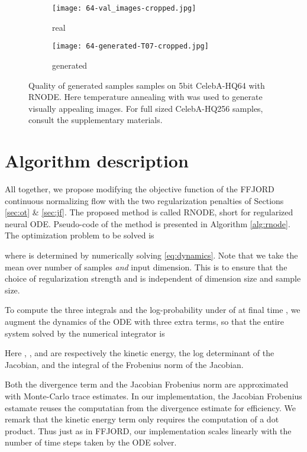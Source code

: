 \documentclass{article}
\theoremstyle{definition}
\theoremstyle{remark}
\begin{document}
\begin{figure*}
  \vskip 0.2in
  \centering
    \begin{subfigure}[t]{.45\textwidth}
    \centering
    \texttt{[image: 64-val\_images-cropped.jpg]}
    \caption{real}\label{fig:realceleb64}
    \end{subfigure} 
    \hspace{3em}
    \begin{subfigure}[t]{.45\textwidth}
    \centering
    \texttt{[image: 64-generated-T07-cropped.jpg]}
    \caption{generated}\label{fig:fakeceleb64}
    \end{subfigure}
    \caption{Quality of generated samples samples on 5bit CelebA-HQ64 with RNODE. Here
      temperature annealing \cite{glow} with  was used to generate
    visually appealing images. For full sized CelebA-HQ256 samples, consult the
  supplementary materials.}\label{fig:celebahq64}
    \vskip -0.2in
\end{figure*}


\section{Algorithm description}
All together, we propose modifying the objective function of the FFJORD continuous normalizing flow
\cite{grathwohl_ffjord} with the two regularization penalties of Sections
\ref{sec:ot} \& \ref{sec:jf}. The proposed method is called RNODE, short for
regularized neural ODE.  Pseudo-code of the method
is presented in Algorithm \ref{alg:rnode}. The optimization problem to be solved is

where  is determined by numerically solving
\eqref{eq:dynamics}. Note that we take the mean over number of samples
\emph{and} input dimension. This is to ensure that the choice of regularization
strength  and  is independent of dimension size and sample
size.

To compute the three integrals and the log-probability under  of  at final time , we augment the dynamics of the ODE with three
extra terms, so that the entire system solved by the numerical integrator is

Here , , and
 are respectively the kinetic energy, the log determinant of the Jacobian,
and the integral of the Frobenius norm of the Jacobian.

Both the divergence term and the Jacobian Frobenius norm are approximated with
Monte-Carlo trace estimates. In our implementation, the Jacobian Frobenius
estamate reuses the computatian  from the divergence
estimate for efficiency. We remark that the kinetic energy term only requires
the computation of a dot product. Thus just as in FFJORD, our implementation
scales linearly with the number of time steps taken by the ODE solver.
\end{document}
